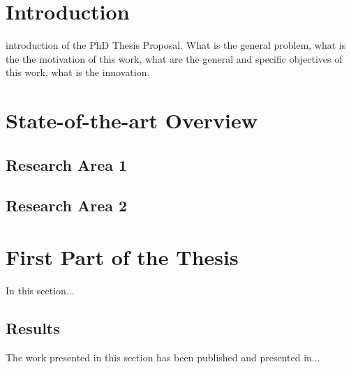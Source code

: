 \documentclass[12pt,journal,onecolumn,twoside]{IEEEtran}
\begin{document}
% 








\maketitle





\section{Introduction}
\thispagestyle{empty}
 introduction of the PhD Thesis Proposal. What is the general problem, what is the the motivation of this work, what are the general and specific objectives of this work, what is the innovation.

\section{State-of-the-art Overview}

\subsection{Research Area 1}

\subsection{Research Area 2}


\section{First Part of the Thesis}

In this section...

\subsection{Results}
The work presented in this section has been published and presented in... \cite{Surname2010}
\end{document}
